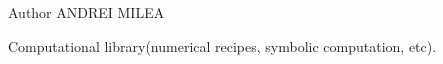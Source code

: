 \begin{DoxyAuthor}{Author}
A\-N\-D\-R\-E\-I M\-I\-L\-E\-A
\end{DoxyAuthor}
Computational library(numerical recipes, symbolic computation, etc). 